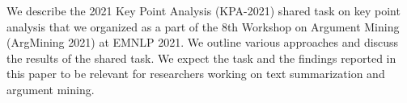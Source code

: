 We describe the 2021 Key Point Analysis (KPA-2021) shared task on key point analysis that we organized as a part of the 8th Workshop on Argument Mining (ArgMining 2021) at EMNLP 2021. We outline various approaches and discuss the results of the shared task. We expect the task and the findings reported in this paper to be relevant for researchers working on text summarization and argument mining.
